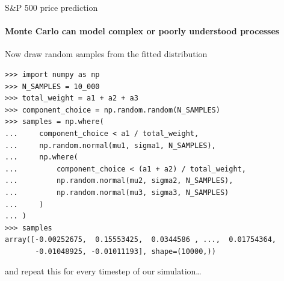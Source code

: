 \documentclass{beamer}
\begin{document}
\begin{frame}[fragile]{S\&P 500 price prediction}
  \framesubtitle{Monte Carlo can model complex or poorly understood processes}

Now draw random samples from the fitted distribution

\vspace{0.5cm}

\begin{lstlisting}
>>> import numpy as np
>>> N_SAMPLES = 10_000
>>> total_weight = a1 + a2 + a3
>>> component_choice = np.random.random(N_SAMPLES)
>>> samples = np.where(
...     component_choice < a1 / total_weight,
...     np.random.normal(mu1, sigma1, N_SAMPLES),
...     np.where(
...         component_choice < (a1 + a2) / total_weight,
...         np.random.normal(mu2, sigma2, N_SAMPLES),
...         np.random.normal(mu3, sigma3, N_SAMPLES)
...     )
... )
>>> samples
array([-0.00252675,  0.15553425,  0.0344586 , ...,  0.01754364,
       -0.01048925, -0.01011193], shape=(10000,))
\end{lstlisting}

\vspace{0.5cm}

and repeat this for every timestep of our simulation\ldots

\end{frame}
\end{document}

